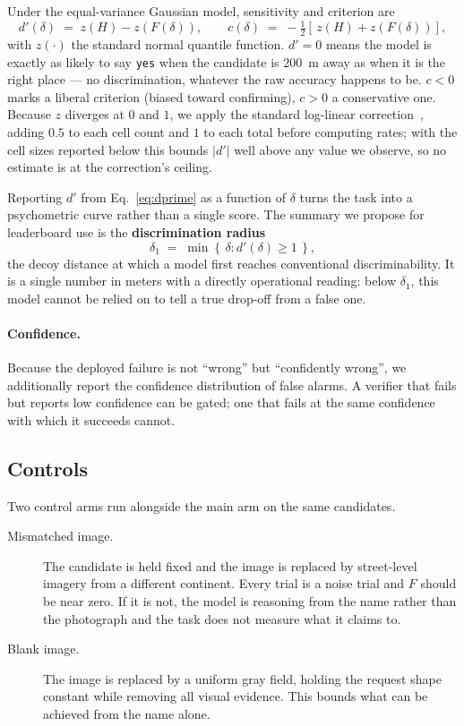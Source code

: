 \documentclass[10pt,a4paper]{article}
\begin{document}
Under the equal-variance Gaussian model, sensitivity and criterion are
%
\begin{equation}
d'(\delta) \;=\; z(H) - z\!\left(F(\delta)\right),
\qquad
c(\delta) \;=\; -\tfrac{1}{2}\left[\,z(H) + z\!\left(F(\delta)\right)\right],
\label{eq:dprime}
\end{equation}
%
with $z(\cdot)$ the standard normal quantile function. $d' = 0$ means the model
is exactly as likely to say \texttt{yes} when the candidate is
\SI{200}{\metre} away as when it is the right place --- no discrimination,
whatever the raw accuracy happens to be. $c < 0$ marks a liberal criterion
(biased toward confirming), $c > 0$ a conservative one. Because $z$ diverges at
$0$ and $1$, we apply the standard log-linear correction~\citep{hautus1995},
adding $0.5$ to each cell count and $1$ to each total before computing rates;
with the cell sizes reported below this bounds $|d'|$ well above any value we
observe, so no estimate is at the correction's ceiling.

Reporting $d'$ from Eq.~\ref{eq:dprime} as a function of $\delta$ turns the task into a psychometric
curve rather than a single score. The summary we propose for leaderboard use is
the \textbf{discrimination radius}
%
\begin{equation}
\delta_{1} \;=\; \min\left\{\, \delta : d'(\delta) \ge 1 \,\right\},
\label{eq:delta1}
\end{equation}
%
the decoy distance at which a model first reaches conventional discriminability.
It is a single number in meters with a directly operational reading: below
$\delta_1$, this model cannot be relied on to tell a true drop-off from a false
one.

\paragraph{Confidence.} Because the deployed failure is not ``wrong'' but
``confidently wrong'', we additionally report the confidence distribution of
false alarms. A verifier that fails but reports low confidence can be gated; one
that fails at the same confidence with which it succeeds cannot.

\subsection{Controls}

Two control arms run alongside the main arm on the same candidates.

\begin{description}
  \item[Mismatched image.] The candidate is held fixed and the image is replaced
  by street-level imagery from a different continent. Every trial is a noise
  trial and $F$ should be near zero. If it is not, the model is reasoning from
  the name rather than the photograph and the task does not measure what it
  claims to.
  \item[Blank image.] The image is replaced by a uniform gray field, holding the
  request shape constant while removing all visual evidence. This bounds what
  can be achieved from the name alone.
\end{description}
\end{document}
